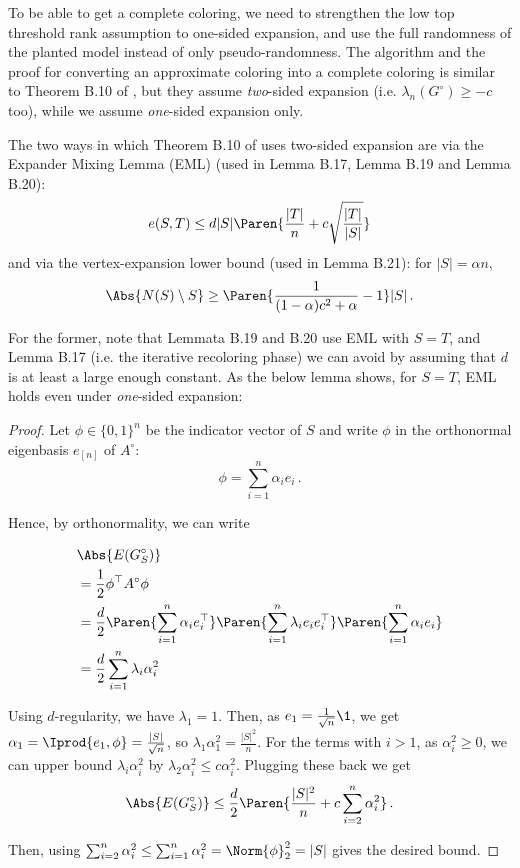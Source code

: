 To be able to get a complete coloring, we need to strengthen the low top threshold rank assumption to one-sided expansion, and use the full randomness of the planted model instead of only pseudo-randomness.
The algorithm and the proof for converting an approximate coloring into a complete coloring is similar to Theorem B.10 of \cite{MR3536556-David16}, but they assume \textit{two}-sided expansion (i.e. $\lambda_n(G^{\circ})\geq -c$ too), while we assume \textit{one}-sided expansion only.

The two ways in which Theorem B.10 of \cite{MR3536556-David16} uses two-sided expansion are via the Expander Mixing Lemma (EML) (used in Lemma B.17, Lemma B.19 and Lemma B.20):
$$e(S, T)\leq d|S|\Paren{\frac{|T|}{n}+c\sqrt{\frac{|T|}{|S|}}}$$
and via the vertex-expansion lower bound (used in Lemma B.21): for $|S|=\alpha n$, 
$$\Abs{N(S)\setminus S}\geq \Paren{\frac{1}{(1-\alpha)c^2+\alpha}-1}|S|\,.$$

For the former, note that Lemmata B.19 and B.20 use EML with $S=T$, and Lemma B.17 (i.e. the iterative recoloring phase) we can avoid by assuming that $d$ is at least a large enough constant. As the below lemma shows, for $S=T$, EML holds even under \textit{one}-sided expansion:


\begin{proof}
    Let $\phi \in \{0,1\}^n$ be the indicator vector of $S$ and write $\phi$ in the orthonormal eigenbasis $e_{[n]}$ of $A^{\circ}$:
    $$\phi = \sum_{i=1}^n \alpha_i e_i\,.$$

    Hence, by orthonormality, we can write

    \begin{align*}
        &\Abs{E(G_S^{\circ})}\\
        &=\frac{1}{2} \phi^\top A^{\circ} \phi\\
        &=\frac{d}{2} \Paren{\sum_{i=1}^n \alpha_i e_i^\top } \Paren{\sum_{i=1}^n \lambda_i e_i e_i^\top } \Paren{\sum_{i=1}^n \alpha_i e_i}\\
        &=\frac{d}{2} \sum_{i=1}^n \lambda_i \alpha_i^2
    \end{align*}

    Using $d$-regularity, we have $\lambda_1=1$.
    Then, as $e_1=\frac{1}{\sqrt{n}}\1$, we get $\alpha_1=\Iprod{e_1, \phi }=\frac{|S|}{\sqrt{n}}$, so $\lambda_1 \alpha_1^2=\frac{|S|^2}{n}$.
    For the terms with $i>1$, as $\alpha_i^2\geq 0$, we can upper bound $\lambda_i \alpha_i^2$ by $\lambda_2 \alpha_i^2\leq c\alpha_i^2$.
    Plugging these back we get
    $$\Abs{E(G_S^{\circ})}\leq \frac{d}{2}\Paren{\frac{|S|^2}{n} + c\sum_{i=2}^n \alpha_i^2}\,.$$

    Then, using $\sum_{i=2}^n \alpha_i^2\leq \sum_{i=1}^n \alpha_i^2=\Norm{\phi}_2^2=|S|$ gives the desired bound.
\end{proof}

